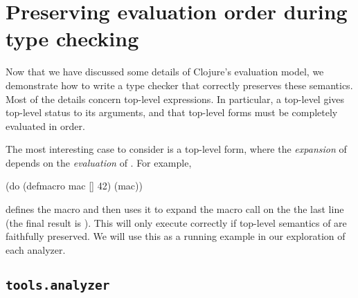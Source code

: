 \section{Preserving evaluation order during type checking}

Now that we have discussed some details of Clojure's evaluation model,
we demonstrate how to write a type checker that correctly preserves
these semantics.
Most of the details concern top-level expressions. In particular,
a top-level  gives top-level status to its arguments, and
that top-level forms must be completely evaluated in order.

The most interesting case to consider is a top-level  form,
where the
\emph{expansion} of 
depends on the \emph{evaluation} of .
For example,

{
\lstset{numbers=left,xleftmargin=2em,framexleftmargin=1.5em}
\begin{cljlisting}
(do (defmacro mac [] 42)
    (mac))
\end{cljlisting}
}

defines the macro  and then uses it to expand
the macro call on the the last line (the final result is ).
This will only execute correctly if top-level semantics of  
are faithfully preserved.
We will use this as a running example in our exploration of
each analyzer.

\subsection{\texttt{tools.analyzer}}

